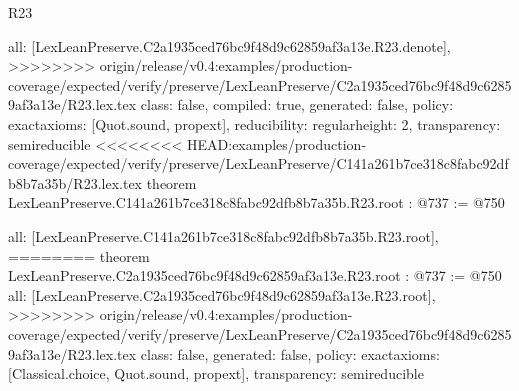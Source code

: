 \begin{lexlean}{R23}
\begin{coremodule}
{{{{{  all: [LexLeanPreserve.C2a1935ced76bc9f48d9c62859af3a13e.R23.denote],
>>>>>>>> origin/release/v0.4:examples/production-coverage/expected/verify/preserve/LexLeanPreserve/C2a1935ced76bc9f48d9c62859af3a13e/R23.lex.tex
  class: false,
  compiled: true,
  generated: false,
  policy: exact{axioms: [Quot.sound, propext]},
  reducibility: regular{height: 2},
  transparency: semireducible
}
<<<<<<<< HEAD:examples/production-coverage/expected/verify/preserve/LexLeanPreserve/C141a261b7ce318c8fabc92dfb8b7a35b/R23.lex.tex
theorem LexLeanPreserve.C141a261b7ce318c8fabc92dfb8b7a35b.R23.root : @737 := @750 {
  all: [LexLeanPreserve.C141a261b7ce318c8fabc92dfb8b7a35b.R23.root],
========
theorem LexLeanPreserve.C2a1935ced76bc9f48d9c62859af3a13e.R23.root : @737 := @750 {
  all: [LexLeanPreserve.C2a1935ced76bc9f48d9c62859af3a13e.R23.root],
>>>>>>>> origin/release/v0.4:examples/production-coverage/expected/verify/preserve/LexLeanPreserve/C2a1935ced76bc9f48d9c62859af3a13e/R23.lex.tex
  class: false,
  generated: false,
  policy: exact{axioms: [Classical.choice, Quot.sound, propext]},
  transparency: semireducible
}

}}}}}
\end{coremodule}
\end{lexlean}
